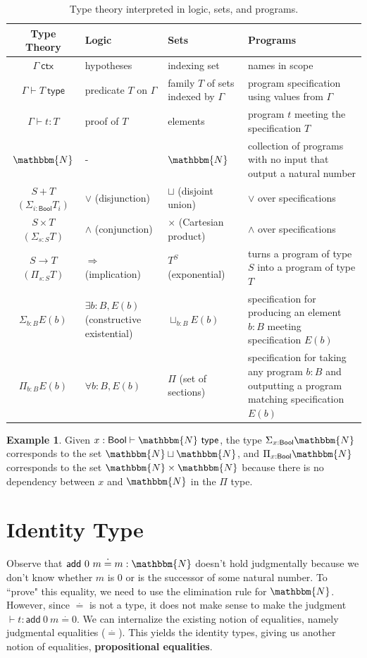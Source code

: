 \documentclass{amsart}
\theoremstyle{definition}
\newtheorem{eg}{Example}[section]
\newcommand{\N}{\mathbbm{N}}
\newcommand{\ctx}{\ensuremath{\mathsf{~ctx}}}
\newcommand{\type}{\ensuremath{\mathsf{~type}}}
\newcommand{\defeq}{\ensuremath{\overset{\boldsymbol{\cdot}}{=}}}
\newcommand{\Bool}{\ensuremath{\mathsf{Bool}}}
\renewcommand{\emph}{\textbf}
\begin{document}
\begin{table}[h]
    \centering
    \begin{tabular}{|c||p{}|p{}|p{}|}\hline
        Type Theory & Logic & Sets & Programs \\\hline
        $\Gamma \ctx$ & hypotheses & indexing set & names in scope \\\hline
        $\Gamma \vdash T \type$ & predicate $T$ on $\Gamma$ & family $T$ of sets indexed by $\Gamma$ & program specification using values from $\Gamma$\\\hline
        $\Gamma \vdash t : T$ & proof of $T$ & elements & program $t$ meeting the specification $T$\\\hline
        $\N$ & - & $\N$ & collection of programs with no input that output a natural number \\\hline
        $S + T$  $(\Sigma_{i : \Bool} T_i)$ & $\vee$ (disjunction) & $\sqcup$ (disjoint union) & $\vee$ over specifications \\\hline
        $S \times T$  $(\Sigma_{s : S} T)$ & $\wedge$ (conjunction) & $\times$ (Cartesian product) & $\wedge$ over specifications \\\hline
        $S \rightarrow T$  $(\Pi_{s : S} T)$ & $\Rightarrow$ (implication) & $T^S$ (exponential) & turns a program of type $S$ into a program of type $T$ \\\hline
        $\Sigma_{b : B} E(b)$ & $\exists b:B, E(b)$ (constructive existential) & $\sqcup_{b : B}E(b)$ & specification for producing an element $b : B$ meeting specification $E(b)$ \\\hline
        $\Pi_{b : B} E(b)$ & $\forall b : B, E(b)$ & $\Pi$ (set of sections) & specification for taking any program $b : B$ and outputting a program matching specification $E(b)$ \\\hline
    \end{tabular}
    \caption{Type theory interpreted in logic, sets, and programs.}
    \label{tb:types-as-logic-sets-programs}
\end{table}

\begin{eg}
    Given $x : \Bool \vdash \N \type$, the type $\Sigma_{x : \Bool} \N$ corresponds to the set $\N \sqcup \N$, and $\Pi_{x : \Bool} \N$ corresponds to the set $\N \times \N$ because there is no dependency between $x$ and $\N$ in the $\Pi$ type.
\end{eg}

\section{Identity Type}
\label{sec:identity}
Observe that $\mathsf{add}~0~m \defeq m : \N$ doesn't hold judgmentally because we don't know whether $m$ is 0 or is the successor of some natural number.
To ``prove" this equality, we need to use the elimination rule for $\N$.
However, since $\defeq$ is not a type, it does not make sense to make the judgment $\vdash t : \mathsf{add}~0~m \defeq 0$.
We can internalize the existing notion of equalities, namely judgmental equalities ($\defeq$).
This yields the identity types, giving us another notion of equalities, \emph{propositional equalities}.
\end{document}
